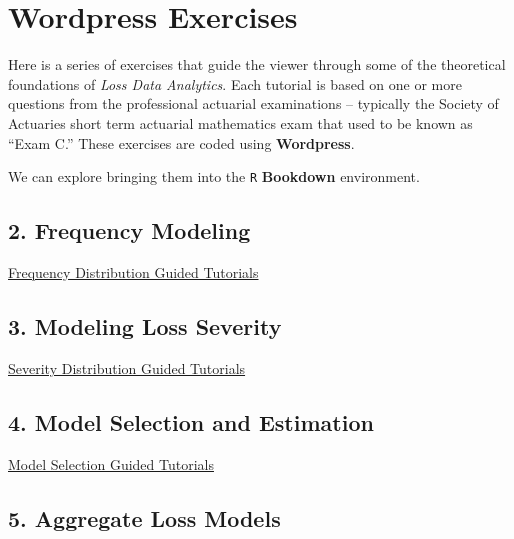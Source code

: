 \documentclass[
]{book}
\begin{document}
\hypertarget{wordpress-exercises}{%
\section{Wordpress Exercises}\label{wordpress-exercises}}

Here is a series of exercises that guide the viewer through some of the theoretical foundations of \emph{Loss Data Analytics}. Each tutorial is based on one or more questions from the professional actuarial examinations -- typically the Society of Actuaries short term actuarial mathematics exam that used to be known as ``Exam C.'' These exercises are coded using \textbf{Wordpress}.

We can explore bringing them into the \texttt{R} \textbf{Bookdown} environment.

\hypertarget{frequency-modeling}{%
\subsection{2. Frequency Modeling}\label{frequency-modeling}}

\href{https://www.ssc.wisc.edu/~jfrees/loss-data-analytics/loss-data-analytics-problems/}{Frequency Distribution Guided Tutorials}

\hypertarget{modeling-loss-severity}{%
\subsection{3. Modeling Loss Severity}\label{modeling-loss-severity}}

\href{http://www.ssc.wisc.edu/~jfrees/loss-data-analytics/chapter-3-modeling-loss-severity/loss-data-analytics-severity-problems/}{Severity Distribution Guided Tutorials}

\hypertarget{model-selection-and-estimation}{%
\subsection{4. Model Selection and Estimation}\label{model-selection-and-estimation}}

\href{http://www.ssc.wisc.edu/~jfrees/loss-data-analytics/loss-data-analytics-model-selection/}{Model Selection Guided Tutorials}

\hypertarget{aggregate-loss-models}{%
\subsection{5. Aggregate Loss Models}\label{aggregate-loss-models}}
\end{document}
